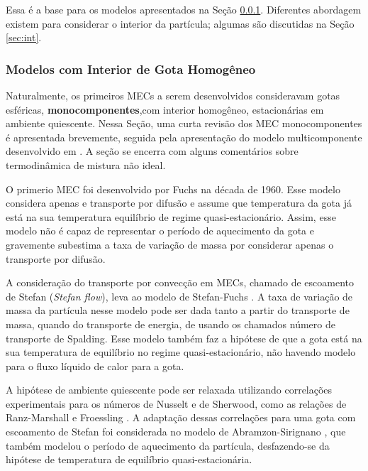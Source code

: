 Essa é a base para os modelos apresentados na Seção \ref{sec:RMM}.
Diferentes abordagem existem para considerar o interior da partícula; algumas são discutidas na Seção \ref{sec:int}.




\subsubsection{Modelos com Interior de Gota Homogêneo} \label{sec:RMM}

Naturalmente, os primeiros MECs a serem desenvolvidos consideravam gotas esféricas, \textbf{monocomponentes},com interior homogêneo, estacionárias em ambiente quiescente.
Nessa Seção, uma curta revisão dos MEC monocomponentes é apresentada brevemente, seguida pela apresentação do modelo multicomponente desenvolvido em \cite{SacomanoF2022IJHMT}.
A seção se encerra com alguns comentários sobre termodinâmica de mistura  não ideal.

O primerio MEC foi desenvolvido por Fuchs \cite{Fuchs1959} na década de 1960. 
Esse modelo considera apenas e transporte por difusão e assume que temperatura da gota já está na sua temperatura equilíbrio de regime quasi-estacionário.
Assim, esse modelo não é capaz de representar o período de aquecimento da gota e gravemente subestima a taxa de variação de massa por considerar apenas o transporte por difusão.

A consideração do transporte por convecção em MECs, chamado de escoamento de Stefan (\emph{Stefan flow}), leva ao modelo de Stefan-Fuchs \cite{Law1978}.
A taxa de variação de massa da partícula nesse modelo pode ser dada tanto a partir do transporte de massa, quando do transporte de energia, de usando os chamados número de transporte de Spalding.
Esse modelo também faz a hipótese de que a gota está na sua temperatura de equilíbrio no regime quasi-estacionário, não havendo modelo para o fluxo líquido de calor para a gota.

A hipótese de ambiente quiescente pode ser relaxada utilizando correlações experimentais para os números de Nusselt e de Sherwood, como as relações de Ranz-Marshall e Froessling \cite{Bird2002}. 
A adaptação dessas correlações para uma gota com escoamento de Stefan foi considerada no modelo de Abramzon-Sirignano \cite{Sirignano1989}, que também modelou o período de aquecimento da partícula, desfazendo-se da hipótese de temperatura de equilíbrio quasi-estacionária.

